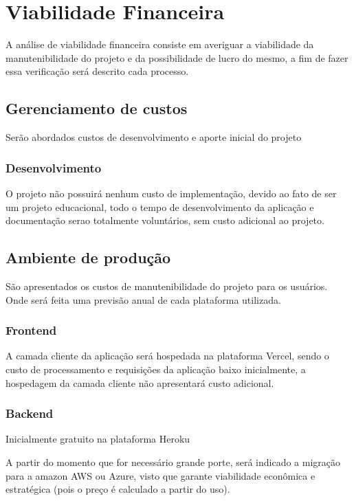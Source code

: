 \section{Viabilidade Financeira}
A análise de viabilidade financeira consiste em averiguar a viabilidade da manutenibilidade do projeto
e da possibilidade de lucro do mesmo, a fim de fazer essa verificação será descrito cada processo.

\subsection{Gerenciamento de custos}
Serão abordados custos de desenvolvimento e aporte inicial do projeto

\subsubsection{Desenvolvimento}
O projeto não possuirá nenhum custo de implementação, devido ao fato de ser um projeto educacional,
todo o tempo de desenvolvimento da aplicação e documentação serao totalmente voluntários, sem custo adicional ao projeto.

\subsection{Ambiente de produção}
São apresentados os custos de manutenibilidade do projeto para os usuários. 
Onde será feita uma previsão anual de cada plataforma utilizada.

\subsubsection{Frontend}
A camada cliente da aplicação será hospedada na plataforma Vercel, sendo o custo de processamento e requisições da aplicação
baixo inicialmente, a hospedagem da camada cliente não apresentará custo adicional.

\subsubsection{Backend}
Inicialmente gratuito na plataforma Heroku

A partir do momento que for necessário grande porte, será indicado a migração para a amazon AWS ou Azure,
visto que garante viabilidade econômica e estratégica (pois o
preço é calculado a partir do uso).

